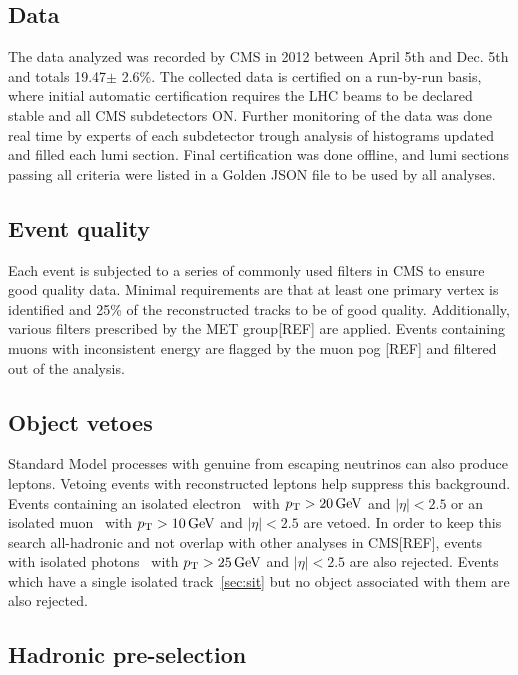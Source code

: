\subsection{Data}
The data analyzed was recorded by CMS in 2012 between April 5th and Dec. 5th and
totals 19.47$\pm$ 2.6\%. The collected data is certified on a run-by-run 
basis, where initial automatic certification requires the LHC beams to be declared
stable and all CMS subdetectors ON. Further monitoring of the data was done real time
by experts of each subdetector trough analysis of histograms updated and filled
each lumi section. Final certification was done offline, and lumi sections passing
all criteria were listed in a Golden JSON file to be used by all analyses. 

\subsection{Event quality}

Each event is subjected to a series of commonly used filters in CMS to ensure good
quality data. Minimal requirements are that at least one primary vertex is identified 
and 25\% of the reconstructed tracks to be of good quality. Additionally, various filters 
prescribed by the MET group[REF] are applied. Events containing muons with inconsistent
energy are flagged by the muon pog [REF] and filtered out of the analysis. 





\subsection{Object vetoes}

Standard Model processes with genuine \met from escaping neutrinos can
also produce leptons. Vetoing events with reconstructed leptons help suppress
this background.  Events containing an isolated electron~\cite{PAS-EGM-10-004} 
with $p_{\mathrm{T}} > 20\,\text{Ge\hspace{-.08em}V}$ and $|\eta| < 2.5$ or an isolated muon~\cite{PAS-MUO-10-002}
with $p_{\mathrm{T}} > 10\,\text{Ge\hspace{-.08em}V}$ and $|\eta| < 2.5$ are vetoed. In order to keep this search
all-hadronic and not overlap with other analyses in CMS[REF], events with isolated
photons~\cite{PAS-EGM-10-006}  with $p_{\mathrm{T}} > 25\,\text{Ge\hspace{-.08em}V}$ and $|\eta| < 2.5$ are also rejected.
Events which have a single isolated track~\ref{sec:sit} but no object 
associated with them are also rejected.

\subsection{Hadronic pre-selection}

